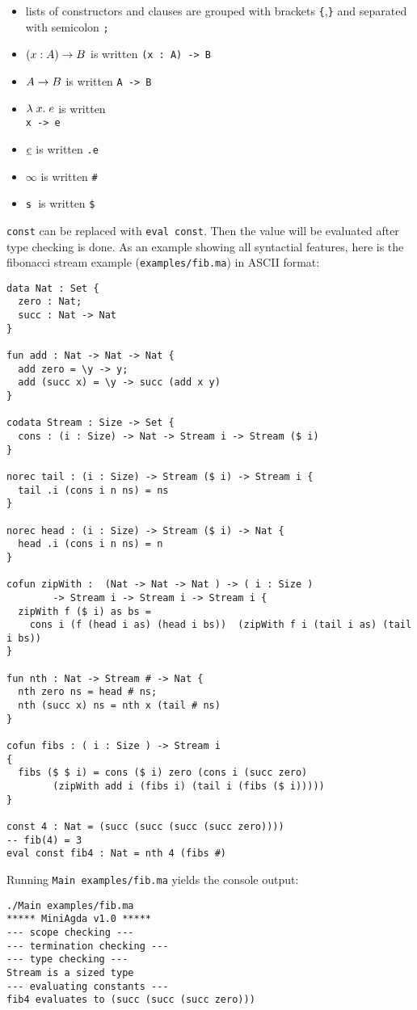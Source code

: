 \begin{itemize}
\item
lists of constructors and clauses are grouped with brackets \texttt{\{},\texttt{\}} and separated with semicolon \texttt{;}
\item
$( x : A ) \rightarrow{B}$ is written \texttt{(x : A) -> B }
\item
$A \rightarrow B$ is written \texttt{A -> B}
\item
$ \lambda\; x .\;e$ is written \texttt{\\ x -> e }
\item
$ \underline{e}$ is written \texttt {.e} 
\item
$ \infty$ is written \texttt{\#} 
\item
$\mathsf{s}\;$ is written \texttt{\$}
\end{itemize}
\texttt{const} can be replaced with {\texttt {eval const}}. Then the value will be evaluated after type checking is done.
As an example showing all syntactial features, here is the fibonacci stream example (\texttt{examples/fib.ma}) in ASCII format:
\begin{verbatim}
data Nat : Set {
  zero : Nat;
  succ : Nat -> Nat 
}

fun add : Nat -> Nat -> Nat {
  add zero = \y -> y;
  add (succ x) = \y -> succ (add x y)
}

codata Stream : Size -> Set {
  cons : (i : Size) -> Nat -> Stream i -> Stream ($ i)
}
 
norec tail : (i : Size) -> Stream ($ i) -> Stream i {
  tail .i (cons i n ns) = ns
}

norec head : (i : Size) -> Stream ($ i) -> Nat {
  head .i (cons i n ns) = n
}

cofun zipWith :  (Nat -> Nat -> Nat ) -> ( i : Size ) 
		-> Stream i -> Stream i -> Stream i {
  zipWith f ($ i) as bs = 
	cons i (f (head i as) (head i bs))  (zipWith f i (tail i as) (tail i bs)) 
}

fun nth : Nat -> Stream # -> Nat {
  nth zero ns = head # ns;
  nth (succ x) ns = nth x (tail # ns) 
}

cofun fibs : ( i : Size ) -> Stream i
{
  fibs ($ $ i) = cons ($ i) zero (cons i (succ zero)
	 	(zipWith add i (fibs i) (tail i (fibs ($ i)))))
}

const 4 : Nat = (succ (succ (succ (succ zero))))
-- fib(4) = 3 
eval const fib4 : Nat = nth 4 (fibs #) 

\end{verbatim}
Running \texttt{Main examples/fib.ma} yields the console output:
\begin{verbatim}
./Main examples/fib.ma
***** MiniAgda v1.0 *****
--- scope checking ---
--- termination checking ---
--- type checking ---
Stream is a sized type 
--- evaluating constants ---
fib4 evaluates to (succ (succ (succ zero)))

\end{verbatim}

